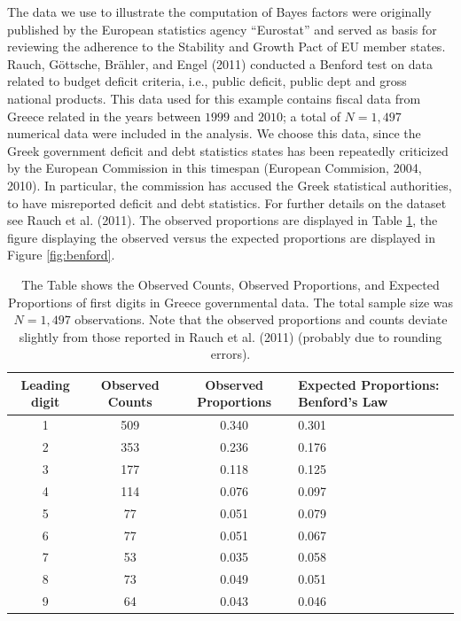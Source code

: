 \documentclass[
  english,
  man,floatsintext]{apa6}
\begin{document}
The data we use to illustrate the computation of Bayes factors were originally published by the European statistics agency ``Eurostat'' and served as basis for reviewing the adherence to the Stability and Growth Pact of EU member states. Rauch, Göttsche, Brähler, and Engel (2011) conducted a Benford test on data related to budget deficit criteria, i.e., public deficit, public dept and gross national products. This data used for this example contains fiscal data from Greece related in the years between \(1999\) and \(2010\); a total of \(N= 1{,}497\) numerical data were included in the analysis. We choose this data, since the Greek government deficit and debt statistics states has been repeatedly criticized by the European Commission in this timespan (European Commision, 2004, 2010). In particular, the commission has accused the Greek statistical authorities, to have misreported deficit and debt statistics. For further details on the dataset see Rauch et al. (2011). The observed proportions are displayed in Table \ref{Tab:benford}, the figure displaying the observed versus the expected proportions are displayed in Figure \ref{fig:benford}.

\begin{table}[h]
    \centering
    \caption{The Table shows the Observed Counts, Observed Proportions, and Expected Proportions of first digits in Greece governmental data. The total sample size was $N = 1{,}497$ observations. Note that the observed proportions and counts deviate slightly from those reported in Rauch et al. (2011) (probably due to rounding errors).}
    \begin{tabular}{cccp{4cm}}
        \hline
Leading digit & Observed Counts & Observed Proportions & Expected Proportions: Benford's Law  \\
        \hline
        1 & 509 & 0.340 & 0.301  \\
        2 & 353 & 0.236 & 0.176  \\
        3 & 177 & 0.118 & 0.125  \\
        4 & 114 & 0.076 & 0.097  \\
        5 & 77 & 0.051 & 0.079  \\
        6 & 77 & 0.051 & 0.067  \\
        7 & 53 & 0.035 & 0.058  \\
        8 & 73 & 0.049 & 0.051  \\
        9 & 64 & 0.043 & 0.046  \\
        \hline
    \end{tabular}
    \label{Tab:benford}
\end{table}
\end{document}
